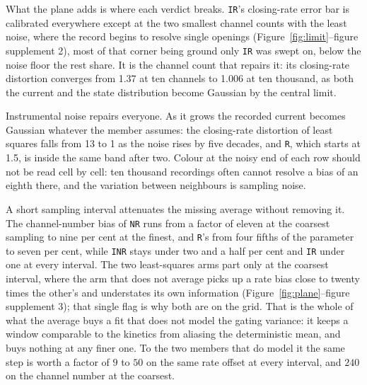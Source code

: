 What the plane adds is where each verdict breaks. \texttt{IR}'s closing-rate error bar is calibrated
everywhere except at the two smallest channel counts with the least noise, where the record begins to resolve single
openings (Figure~\ref{fig:limit}--figure supplement 2), most of that corner being
ground only \texttt{IR} was swept on, below the noise floor the rest share. It is the channel count
that repairs it: its closing-rate distortion converges from 1.37 at ten channels to 1.006 at ten
thousand, as both the current and the state distribution become Gaussian by the central limit.

Instrumental noise repairs everyone. As it grows the recorded current becomes Gaussian whatever the
member assumes: the closing-rate distortion of least squares falls from 13 to 1 as the noise rises
by five decades, and \texttt{R}, which starts at 1.5, is inside the same band after two. Colour at
the noisy end of each row should not be read cell by cell: ten thousand recordings often cannot
resolve a bias of an eighth there, and the variation between neighbours is sampling noise.

A short sampling interval attenuates the missing average without removing it. The channel-number
bias of \texttt{NR} runs from a factor of eleven at the coarsest sampling to nine per cent at the
finest, and \texttt{R}'s from four fifths of the parameter to seven per cent, while \texttt{INR}
stays under two and a half per cent and \texttt{IR} under one at every interval. The two
least-squares arms part only at the coarsest interval, where the arm that does not average picks up
a rate bias close to twenty times the other's and understates its own information
(Figure~\ref{fig:plane}--figure supplement 3); that single flag is why both are on the grid.
That is the whole of what the average buys a fit that does not model the gating variance: it keeps
a window comparable to the kinetics from aliasing the deterministic mean, and buys nothing at any
finer one. To the two members that do model it the same step is worth a factor of $9$ to $50$ on
the same rate offset at every interval, and $240$ on the channel number at the coarsest.

